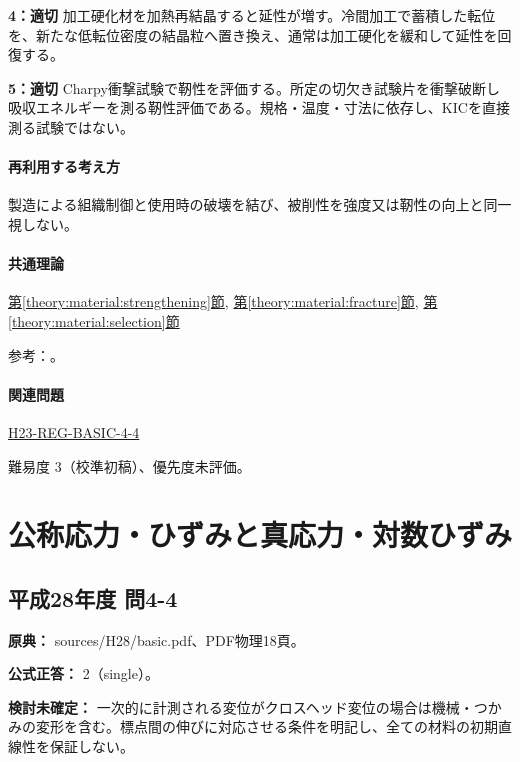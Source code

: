 \noindent\textbf{4：適切} 加工硬化材を加熱再結晶すると延性が増す。冷間加工で蓄積した転位を、新たな低転位密度の結晶粒へ置き換え、通常は加工硬化を緩和して延性を回復する。\par

\noindent\textbf{5：適切} Charpy衝撃試験で靭性を評価する。所定の切欠き試験片を衝撃破断し吸収エネルギーを測る靭性評価である。規格・温度・寸法に依存し、KICを直接測る試験ではない。\par

\paragraph{再利用する考え方} 製造による組織制御と使用時の破壊を結び、被削性を強度又は靭性の向上と同一視しない。

\paragraph{共通理論} \hyperref[theory:material:strengthening]{第\ref*{theory:material:strengthening}節}, \hyperref[theory:material:fracture]{第\ref*{theory:material:fracture}節}, \hyperref[theory:material:selection]{第\ref*{theory:material:selection}節}

\par 参考：\cite{mit_material_dislocations2001,sulfur_machinability2004,nist_charpy,hall_petch_limits2020}。

\paragraph{関連問題} \hyperref[q:h23-reg-basic-4-4]{H23-REG-BASIC-4-4}

\par 難易度 3（校準初稿）、優先度未評価。

\section{公称応力・ひずみと真応力・対数ひずみ}

\subsection{平成28年度 問4-4}
\label{q:h28-reg-basic-4-4}

\noindent\textbf{原典：} sources/H28/basic.pdf、PDF物理18頁。

\textbf{公式正答：} 2（single）。

\par\textbf{検討未確定：} 一次的に計測される変位がクロスヘッド変位の場合は機械・つかみの変形を含む。標点間の伸びに対応させる条件を明記し、全ての材料の初期直線性を保証しない。


